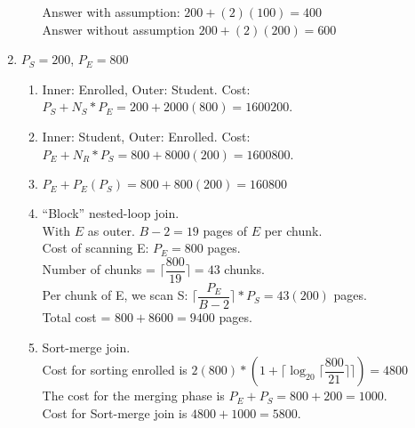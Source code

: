 \documentclass{report}
\begin{document}
\begin{enumerate}
\begin{enumerate}
			Answer with assumption: $200+ (2)(100) = 400$ \\
			Answer without assumption $200 + (2)(200) = 600$
		\end{enumerate}
		\newpage
		\item $P_S = 200$, $P_E = 800$
		\begin{enumerate}
			\item Inner: Enrolled, Outer: Student. Cost: $P_S + N_S * P_E = 200 + 2000(800) = 1600200$.
			\item Inner: Student, Outer: Enrolled. Cost: $P_E + N_R * P_S = 800 + 8000(200) = 1600800$.
			\item $P_E + P_E(P_S) = 800 + 800(200) = 160800$
			\item ``Block'' nested-loop join. \\
			With $E$ as outer. $B-2 = 19$ pages of $E$ per chunk. \\
			Cost of scanning E: $P_E = 800$ pages. \\
			Number of chunks = $\lceil \dfrac{800}{19} \rceil = 43 $ chunks. \\
			Per chunk of E, we scan S: $\lceil \dfrac{P_E}{B-2} \rceil * P_S = 43(200)$ pages.  \\
			Total cost = $800 + 8600 = 9400$ pages.
			\item Sort-merge join. \\
			Cost for sorting enrolled is $2(800) * (1 + \lceil\log_{20} \lceil \dfrac{800}{21}\rceil\rceil) = 4800$ \\
			The cost for the merging phase is $P_E + P_S = 800 + 200 = 1000$. \\
			Cost for Sort-merge join is $4800 + 1000 = 5800$.
		\end{enumerate}
	\end{enumerate}
\end{document}
